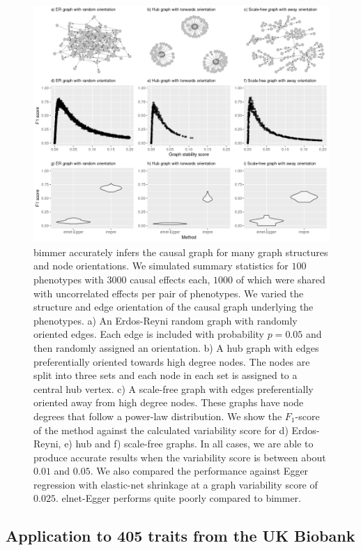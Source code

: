 \documentclass{article}
\begin{document}
\begin{figure}
\includegraphics[width=\textwidth]{figures/figure4.png}
\caption{bimmer accurately infers the causal graph for many graph structures and node
orientations. We simulated summary statistics for $100$ phenotypes with $3000$ causal
effects each, $1000$ of which were shared with uncorrelated effects per pair of phenotypes.
We varied the structure and edge orientation of the causal graph underlying the phenotypes.
a) An Erdos-Reyni random graph with randomly oriented edges. Each edge is
included with probability $p=0.05$ and then randomly assigned an orientation. b) A hub
graph with edges preferentially oriented towards high degree nodes. The nodes are split into
three sets and each node in each set is assigned to a central hub vertex. c) A scale-free
graph with edges preferentially oriented away from high degree nodes. These graphs have
node degrees that follow a power-law distribution. We show the $F_1$-score of the method
against the calculated variability score for d) Erdos-Reyni, e) hub and f) scale-free graphs.
In all cases, we are able to produce accurate results when the variability score is between
about $0.01$ and $0.05$. We also compared the performance against Egger regression
with elastic-net shrinkage at a graph variability score of $0.025$. elnet-Egger
performs quite poorly compared to bimmer.}
\label{figure4}
\end{figure}


\subsection*{Application to 405 traits from the UK Biobank}
\end{document}
